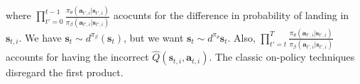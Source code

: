 \documentclass{report}
\begin{document}
where $ \prod_{t'=0}^{t-1} \frac{\pi_{ \theta } (\bm{a}_{t',i}|\bm{s}_{t',i})}{\pi_{ \beta } (\bm{a}_{t',i}|\bm{s}_{t',i})}  $
acocunts for the difference in probability of landing in $ \bm{s}_{t,i}  $.
We have $ \bm{s}_{t}\sim d^{ \pi_{ \beta } }  (\bm{s}_{t})$, but we want
$ \bm{s}_{t}\sim d^{ \pi_{ \theta } }  \bm{s}_{t}$.
Also, $ \prod_{t'=t}^{T} \frac{\pi_{ \theta } (\bm{a}_{t',i}| \bm{s}_{t',i} )}{\pi_{ \beta }(\bm{a}_{t',i}| \bm{s}_{t',i} )}  $
accounts for having the incorrect $ \hat{Q} (\bm{s}_{t,i}, \bm{a}_{t,i} )  $.
The classic on-policy techniques disregard the first product.
\end{document}
